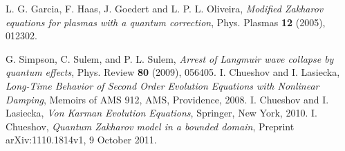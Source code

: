 \documentclass[10pt,a4paper]{article}
\begin{document}
\begin{thebibliography}{6}



L. G. Garcia, F. Haas, J. Goedert and L. P. L. Oliveira,
\emph{Modified Zakharov equations for plasmas with a quantum
correction},  Phys. Plasmas {\bf 12} (2005), 012302. 

G. Simpson, C. Sulem, and P. L. Sulem,
\emph{Arrest of Langmuir wave collapse by quantum effects},
Phys. Review  {\bf 80} (2009),  056405. 
 I.
Chueshov and I. Lasiecka, \textit{Long-Time Behavior of Second Order
Evolution Equations with Nonlinear Damping}, Memoirs of AMS 912, AMS,
Providence, 2008.
I. Chueshov and I. Lasiecka, {\it Von Karman  Evolution Equations},
Sprin\-ger, New York, 2010.  
I. Chueshov, \emph{Quantum Zakharov model in a bounded domain},
Preprint   arXiv:1110.1814v1,  9 October 2011.
\end{thebibliography}
\end{document}
